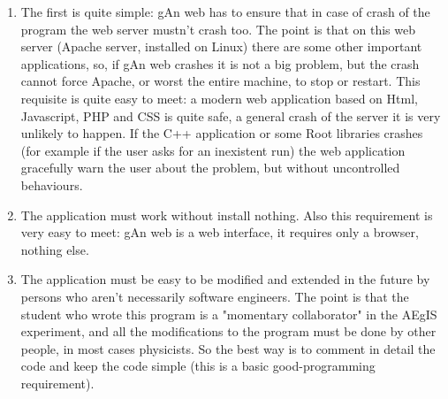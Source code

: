 \begin{enumerate}

\item The first is quite simple: gAn web has to ensure that in case of crash of the program the web server mustn't crash too. The point is that on this web server (Apache server, installed on Linux) there are some other important applications, so, if gAn web crashes it is not a big problem, but the crash cannot force Apache, or worst the entire machine, to stop or restart. 
This requisite is quite easy to meet: a modern web application based on Html, Javascript, PHP and CSS is quite safe, a general crash of the server it is very unlikely to happen. If the C++ application or some Root libraries crashes (for example if the user asks for an inexistent run) the web application gracefully warn the user about the problem, but without uncontrolled behaviours.  

\item The application must work without install nothing. Also this requirement is very easy to meet: gAn web is a web interface, it requires only a browser, nothing else.

\item The application must be easy to be modified and extended in the future by persons who aren't necessarily software engineers. The point is that the student who wrote this program is a "momentary collaborator" in the AEgIS experiment, and all the modifications to the program must be done by other people, in most cases physicists. So the best way is to comment in detail the code and keep the code simple (this is a basic good-programming requirement).   

\end{enumerate}

